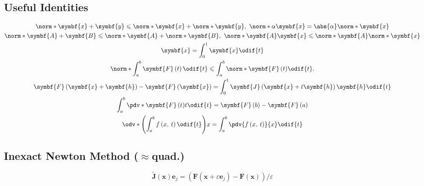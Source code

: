 \documentclass{article}
\begin{document}
\begin{minipage}[t]{62.39259259mm}
    \subsection{Useful Identities}
    \begin{gather*}
        \norm*{\symbf{x} + \symbf{y}} \leqslant \norm*{\symbf{x}} + \norm*{\symbf{y}},\ \norm*{\alpha \symbf{x}} = \abs{\alpha} \norm*{\symbf{x}} \\
        \norm*{\symbf{A} + \symbf{B}} \leqslant \norm*{\symbf{A}} + \norm*{\symbf{B}},\ \norm*{\symbf{A} \symbf{x}} \leqslant \norm*{\symbf{A}} \norm*{\symbf{x}} \\
        \symbf{x} = \int_0^1 \symbf{x} \odif{t}\\
        \norm*{\int_a^b \symbf{F}\left( t \right) \odif{t}} \leqslant \int_a^b \norm*{\symbf{F}\left( t \right)} \odif{t}. \\
        \symbf{F}\left( \symbf{x} + \symbf{h} \right) - \symbf{F}\left( \symbf{x} \right) = \int_0^1 \symbf{J}\left( \symbf{x} + t \symbf{h} \right) \symbf{h} \odif{t} \\
        \int_a^b \pdv*{\symbf{F}\left( t \right)}{t} \odif{t} = \symbf{F}\left( b \right) - \symbf{F}\left( a \right) \\
        \odv*{\left( \int_a^b f\left( x,\: t \right) \odif{t} \right)}{x} = \int_a^b \pdv{f\left( x,\: t \right)}{x} \odif{t}
    \end{gather*}
    \subsection{Inexact Newton Method (\texorpdfstring{\(\approx\)}{~}quad.)}
    \begin{equation*}
        \tilde{\symbf{J}}\left( \symbf{x} \right) \symbf{e}_j = \left( \symbf{F}\left( \symbf{x} + \varepsilon \symbf{e}_j \right) - \symbf{F}\left( \symbf{x} \right) \right) / \varepsilon
    \end{equation*}
\end{minipage}
\newpage
\end{document}
